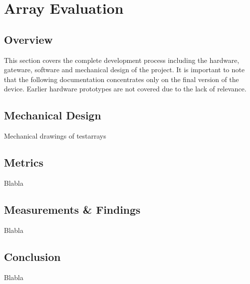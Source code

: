 \chapter{Array Evaluation}
\section{Overview}
This section covers the complete development process including the hardware, gateware, software and mechanical design of the project. It is important to note that the following documentation concentrates only on the final version of the device. Earlier hardware prototypes are not covered due to the lack of relevance.

\newpage
\section{Mechanical Design}
Mechanical drawings of testarrays

\newpage
\section{Metrics}
Blabla

\newpage
\section{Measurements \& Findings}
Blabla


\newpage
\section{Conclusion}
Blabla




